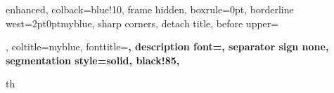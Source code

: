 


{%
    enhanced,
    colback=blue!10,
    frame hidden,
    boxrule=0pt,
    borderline west={2pt}{0pt}{myblue},
    sharp corners,
    detach title,
    before upper=\tcbtitle\par\smallskip,
    coltitle=myblue,
    fonttitle=\bfseries\sffamily,
    description font=\mdseries,
    separator sign none,
    segmentation style={solid, black!85},
}{th}

\newenvironment{algorithm}[1]
{\stepcounter{algorithmcounter}\begin{algorithminner}{#1}{algorithm-\arabic{section}-\arabic{algorithmcounter}}}
{\end{algorithminner}}




